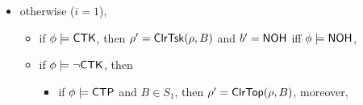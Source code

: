 {\begin{itemize}
\begin{itemize}
\begin{itemize}
\begin{itemize}
\begin{itemize}
\begin{itemize}
\begin{itemize}
								\item otherwise ($\getrealtsk(\rho,B) = S_i$ and $\zeta_i = \mainflag$ or $\getrealtsk(\rho,B) = * \wedge\gettsk(\rho,B) = S_i$), 
								\begin{itemize}
									\item if $\phi\models\stpflag$ and $\topact(S_i) = B$, then $\rho' = \rmact(\mvtsktop(\rho, i), 2, 1)$ and $b' = \neg \nohflag$, 
									\item otherwise, $\rho' = \rmact(\push(\mvtsktop(\rho, i), B), 2, 1)$ and $b' = \nohflag$ iff $\phi \models \nohflag$, 
								\end{itemize}
							\end{itemize}
						\end{itemize}
					\end{itemize}
			\end{itemize}
		\item otherwise ($i  = 1$),  
		\begin{itemize}
			\item if $\phi \models {\sf CTK}$, then $\rho' = \mathsf{ClrTsk}(\rho,B)$ and $b' = \nohflag$ iff $\phi \models \nohflag$, 
			\item if $\phi \models \neg {\sf CTK}$, then
			\begin{itemize}
				\item if $\phi \models {\sf CTP}$ and $B \in S_1$, then $\rho'=\mathsf{ClrTop}(\rho, B)$, moreover, 
				\begin{itemize}

\end{itemize}
\end{itemize}
\end{itemize}
\end{itemize}
\end{itemize}
\end{itemize}}
